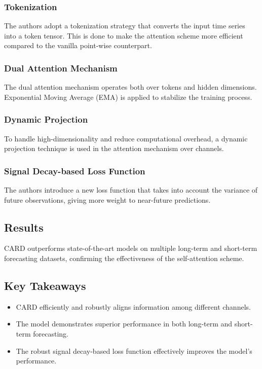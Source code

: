 \documentclass{article}
\begin{document}
\subsubsection{Tokenization}
The authors adopt a tokenization strategy that converts the input time series into a token tensor. This is done to make the attention scheme more efficient compared to the vanilla point-wise counterpart.

\subsubsection{Dual Attention Mechanism}
The dual attention mechanism operates both over tokens and hidden dimensions. Exponential Moving Average (EMA) is applied to stabilize the training process.

\subsubsection{Dynamic Projection}
To handle high-dimensionality and reduce computational overhead, a dynamic projection technique is used in the attention mechanism over channels.

\subsubsection{Signal Decay-based Loss Function}
The authors introduce a new loss function that takes into account the variance of future observations, giving more weight to near-future predictions.

\subsection{Results}
CARD outperforms state-of-the-art models on multiple long-term and short-term forecasting datasets, confirming the effectiveness of the self-attention scheme.

\subsection{Key Takeaways}
\begin{itemize}
    \item CARD efficiently and robustly aligns information among different channels.
    \item The model demonstrates superior performance in both long-term and short-term forecasting.
    \item The robust signal decay-based loss function effectively improves the model's performance.
\end{itemize}
\end{document}
